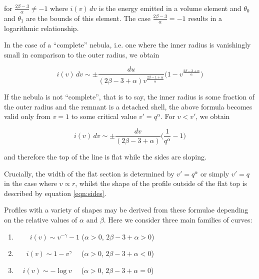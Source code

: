 \documentclass[useAMS,usenatbib,usegraphicx]{mnras}
\begin{document}
\noindent for $\frac{2\beta-3}{\alpha} \neq -1$ where $i(v) \,dv$ is the energy emitted in a volume element and $\theta_0$ and $\theta_1$ are the bounds of this element.  The case 
$\frac{2\beta-3}{\alpha} = -1$ results in a logarithmic relationship.


In the case of a ``complete'' nebula, i.e. one where the inner radius is 
vanishingly small in comparison to the outer radius, we obtain

\begin{equation}
\label{eqn:sides}
	i(v) \, dv \sim \pm \frac{du}{(2\beta-3+\alpha) v^{\frac{2\beta-1+\alpha}{\alpha}}} \Big(1-v^{\frac{2\beta-3+\alpha}{\alpha}} \Big)
\end{equation}

If the nebula is not ``complete'', that is to say, the inner radius is some fraction of the outer radius and the remnant is a detached shell, the above formula becomes valid only from $v=1$ to some critical value $v'=q^\alpha$. For $v<v'$, we obtain

\begin{equation}
i(v) \, dv \sim \pm \frac{dv}{(2\beta-3+\alpha)} \Big( \frac{1}{q^\alpha} - 1 \Big)
\end{equation}

\noindent and therefore the top of the line is flat while the sides are 
sloping.

Crucially, the width of the flat section is determined by $v'=q^\alpha$ or 
simply $v'=q$ in the case where $v \propto r$, whilst the shape of the 
profile outside of the flat top is described by equation \ref{eqn:sides}.

Profiles with a variety of shapes may be derived from these formulae 
depending on the relative values of $\alpha$ and $\beta$.  Here we 
consider three main families of curves:


\begin{enumerate}\parskip3pt

	\item \ \ $\quad i(v)  \sim v^{-\gamma}-1$ \quad ($\alpha>0$, $2\beta-3+\alpha>0$)
	\item \ $\quad i(v)  \sim 1-v^\gamma$ \quad \ \ ($\alpha>0$, $2\beta-3+\alpha<0$)
	\item  $\quad i(v) \sim -\log v$ \quad \ \ ($\alpha>0$, $2\beta-3+\alpha=0$)

\end{enumerate}
\end{document}
